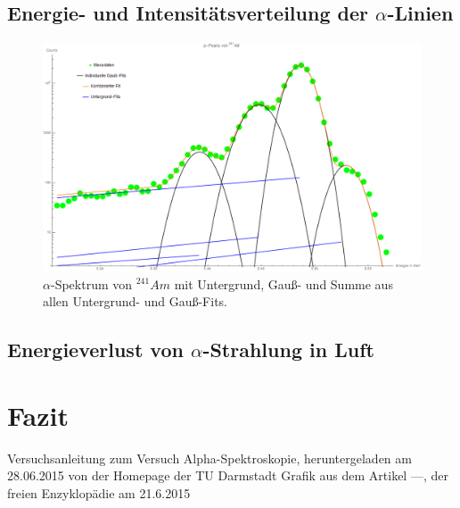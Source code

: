 \documentclass[bigchapter,colorback,accentcolor=tud4b,linedtoc,11pt]{tudreport}
\begin{document}
\section{Energie- und Intensitätsverteilung der $\alpha$-Linien}
\begin{figure}[h] 
  \centering
     \includegraphics[width=1\textwidth]{img/alpha-spektrum.png}
  \caption{$\alpha$-Spektrum von $^{241}Am$ mit Untergrund, Gauß- und
    Summe aus allen Untergrund- und Gauß-Fits.}
  \label{fig:Bild1}
\end{figure}

\section{Energieverlust von $\alpha$-Strahlung in Luft}
\begin{figure}[H]
    \caption{}
\end{figure}

\chapter{Fazit}
\cleardoublepage{}
\newpage
\begin{thebibliography}{100}
   Versuchsanleitung zum Versuch Alpha-Spektroskopie, heruntergeladen am 28.06.2015 von der Homepage der TU Darmstadt
   Grafik aus dem Artikel ---, der freien Enzyklopädie am 21.6.2015 \url{}
  
\end{thebibliography}
\end{document}
